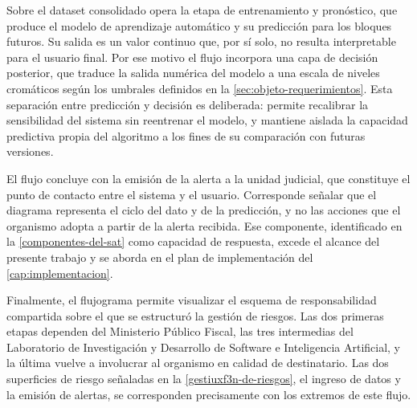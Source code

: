 Sobre el dataset consolidado opera la etapa de entrenamiento y pronóstico, que produce el modelo de aprendizaje automático y su predicción para los bloques futuros. Su salida es un valor continuo que, por sí solo, no resulta interpretable para el usuario final. Por ese motivo el flujo incorpora una capa de decisión posterior, que traduce la salida numérica del modelo a una escala de niveles cromáticos según los umbrales definidos en la \cref{sec:objeto-requerimientos}. Esta separación entre predicción y decisión es deliberada: permite recalibrar la sensibilidad del sistema sin reentrenar el modelo, y mantiene aislada la capacidad predictiva propia del algoritmo a los fines de su comparación con futuras versiones.

El flujo concluye con la emisión de la alerta a la unidad judicial, que constituye el punto de contacto entre el sistema y el usuario. Corresponde señalar que el diagrama representa el ciclo del dato y de la predicción, y no las acciones que el organismo adopta a partir de la alerta recibida. Ese componente, identificado en la \cref{componentes-del-sat} como capacidad de respuesta, excede el alcance del presente trabajo y se aborda en el plan de implementación del \cref{cap:implementacion}.

Finalmente, el flujograma permite visualizar el esquema de responsabilidad compartida sobre el que se estructuró la gestión de riesgos. Las dos primeras etapas dependen del Ministerio Público Fiscal, las tres intermedias del Laboratorio de Investigación y Desarrollo de Software e Inteligencia Artificial, y la última vuelve a involucrar al organismo en calidad de destinatario. Las dos superficies de riesgo señaladas en la \cref{gestiuxf3n-de-riesgos}, el ingreso de datos y la emisión de alertas, se corresponden precisamente con los extremos de este flujo.

